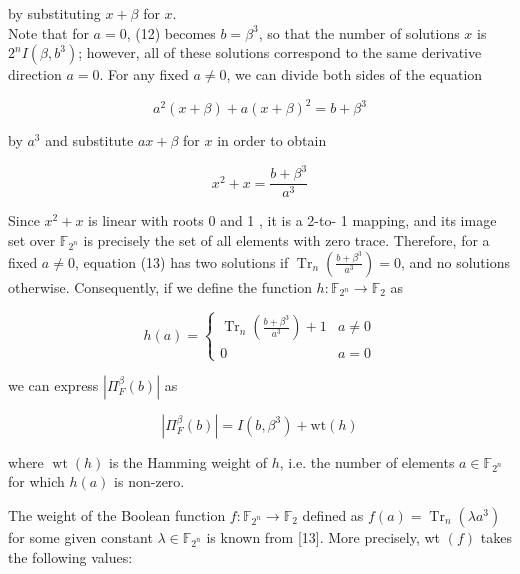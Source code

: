 \documentclass[10pt]{article}
\begin{document}
by substituting $x+\beta$ for $x$.\\
Note that for $a=0$, (12) becomes $b=\beta^{3}$, so that the number of solutions $x$ is $2^{n} I\left(\beta, b^{3}\right)$; however, all of these solutions correspond to the same derivative direction $a=0$. For any fixed $a \neq 0$, we can divide both sides of the equation

$$
a^{2}(x+\beta)+a(x+\beta)^{2}=b+\beta^{3}
$$

by $a^{3}$ and substitute $a x+\beta$ for $x$ in order to obtain


\begin{equation*}
x^{2}+x=\frac{b+\beta^{3}}{a^{3}} \tag{13}
\end{equation*}


Since $x^{2}+x$ is linear with roots 0 and 1 , it is a 2-to- 1 mapping, and its image set over $\mathbb{F}_{2^{n}}$ is precisely the set of all elements with zero trace. Therefore, for a fixed $a \neq 0$, equation (13) has two solutions if $\operatorname{Tr}_{n}\left(\frac{b+\beta^{3}}{a^{3}}\right)=0$, and no solutions otherwise. Consequently, if we define the function $h: \mathbb{F}_{2^{n}} \rightarrow \mathbb{F}_{2}$ as

$$
h(a)= \begin{cases}\operatorname{Tr}_{n}\left(\frac{b+\beta^{3}}{a^{3}}\right)+1 & a \neq 0 \\ 0 & a=0\end{cases}
$$

we can express $\left|\Pi_{F}^{\beta}(b)\right|$ as


\begin{equation*}
\left|\Pi_{F}^{\beta}(b)\right|=I\left(b, \beta^{3}\right)+\mathrm{wt}(h) \tag{14}
\end{equation*}


where $\operatorname{wt}(h)$ is the Hamming weight of $h$, i.e. the number of elements $a \in \mathbb{F}_{2^{n}}$ for which $h(a)$ is non-zero.

The weight of the Boolean function $f: \mathbb{F}_{2^{n}} \rightarrow \mathbb{F}_{2}$ defined as $f(a)=\operatorname{Tr}_{n}\left(\lambda a^{3}\right)$ for some given constant $\lambda \in \mathbb{F}_{2^{n}}$ is known from [13]. More precisely, wt $(f)$ takes the following values:
\end{document}
